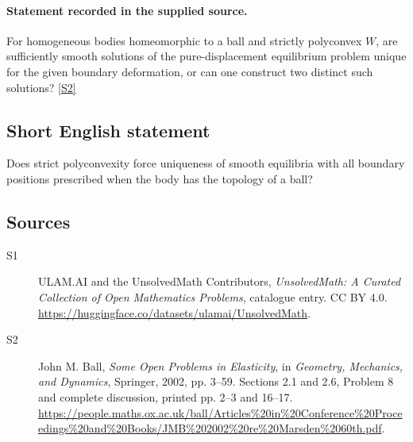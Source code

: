 \documentclass[11pt]{book}
\newcommand{\sref}[2]{\hyperlink{source:#1:#2}{[S#2]}}
\begin{document}
\paragraph{Statement recorded in the supplied source.}
For homogeneous bodies homeomorphic to a ball and strictly polyconvex $W$, are sufficiently smooth solutions of the pure-displacement equilibrium problem unique for the given boundary deformation, or can one construct two distinct such solutions? \sref{statement}{2}
\subsection{Short English statement}
Does strict polyconvexity force uniqueness of smooth equilibria with all boundary positions prescribed when the body has the topology of a ball?
\subsection{Sources}
\begin{description}
\item[\hypertarget{source:statement:1}{S1}] ULAM.AI and the UnsolvedMath Contributors, \emph{UnsolvedMath: A Curated Collection of Open Mathematics Problems}, catalogue entry. CC BY 4.0. \url{https://huggingface.co/datasets/ulamai/UnsolvedMath}.
\item[\hypertarget{source:statement:2}{S2}] John M. Ball, \emph{Some Open Problems in Elasticity}, in \emph{Geometry, Mechanics, and Dynamics}, Springer, 2002, pp. 3--59. Sections 2.1 and 2.6, Problem 8 and complete discussion, printed pp. 2--3 and 16--17. \url{https://people.maths.ox.ac.uk/ball/Articles%20in%20Conference%20Proceedings%20and%20Books/JMB%202002%20re%20Marsden%2060th.pdf}.
\end{description}
\label{end:statement}
\end{document}
